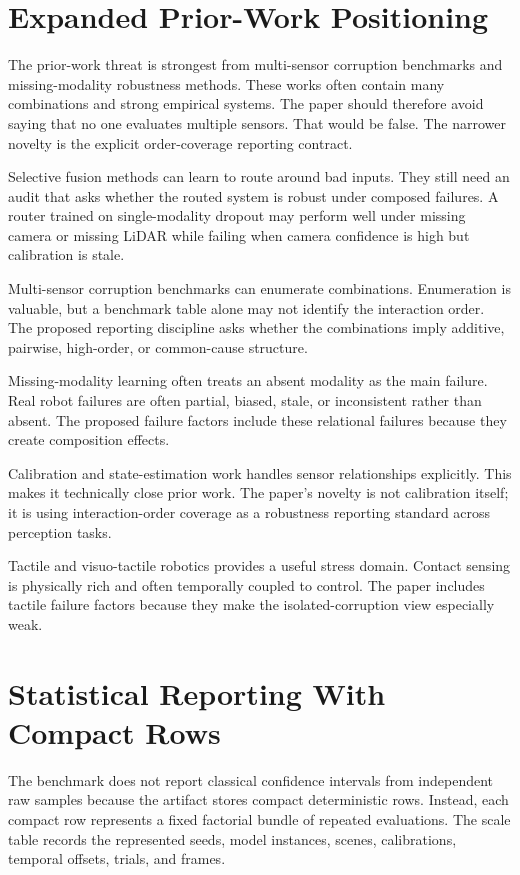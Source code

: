 \documentclass{article}
\begin{document}
\section{Expanded Prior-Work Positioning}

The prior-work threat is strongest from multi-sensor corruption benchmarks and missing-modality robustness methods. These works often contain many combinations and strong empirical systems. The paper should therefore avoid saying that no one evaluates multiple sensors. That would be false. The narrower novelty is the explicit order-coverage reporting contract.

Selective fusion methods can learn to route around bad inputs. They still need an audit that asks whether the routed system is robust under composed failures. A router trained on single-modality dropout may perform well under missing camera or missing LiDAR while failing when camera confidence is high but calibration is stale.

Multi-sensor corruption benchmarks can enumerate combinations. Enumeration is valuable, but a benchmark table alone may not identify the interaction order. The proposed reporting discipline asks whether the combinations imply additive, pairwise, high-order, or common-cause structure.

Missing-modality learning often treats an absent modality as the main failure. Real robot failures are often partial, biased, stale, or inconsistent rather than absent. The proposed failure factors include these relational failures because they create composition effects.

Calibration and state-estimation work handles sensor relationships explicitly. This makes it technically close prior work. The paper's novelty is not calibration itself; it is using interaction-order coverage as a robustness reporting standard across perception tasks.

Tactile and visuo-tactile robotics provides a useful stress domain. Contact sensing is physically rich and often temporally coupled to control. The paper includes tactile failure factors because they make the isolated-corruption view especially weak.

\section{Statistical Reporting With Compact Rows}

The benchmark does not report classical confidence intervals from independent raw samples because the artifact stores compact deterministic rows. Instead, each compact row represents a fixed factorial bundle of repeated evaluations. The scale table records the represented seeds, model instances, scenes, calibrations, temporal offsets, trials, and frames.
\end{document}
